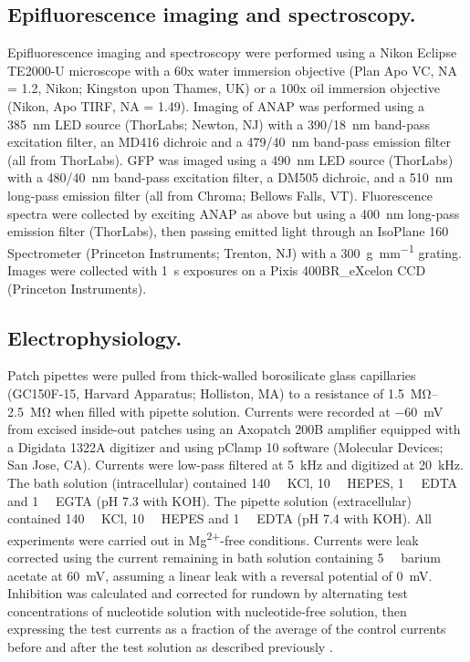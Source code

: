 \documentclass[10pt,lineno, doublespacing]{elife}
\begin{document}
\subsection{Epifluorescence imaging and spectroscopy.}
Epifluorescence imaging and spectroscopy were performed using a Nikon Eclipse TE2000-U microscope with a 60x water immersion objective (Plan Apo VC, NA = 1.2, Nikon; Kingston upon Thames, UK) or a 100x oil immersion objective (Nikon, Apo TIRF, NA = 1.49).
Imaging of ANAP was performed using a \SI{385}{\nano\metre} LED source (ThorLabs; Newton, NJ) with a \SI{390/18}{\nano\metre} band-pass excitation filter, an MD416 dichroic and a \SI{479/40}{\nano\metre} band-pass emission filter (all from ThorLabs).
GFP was imaged using a \SI{490}{\nano\metre} LED source (ThorLabs) with a \SI{480/40}{\nano\metre} band-pass excitation filter, a DM505 dichroic, and a \SI{510}{\nano\metre} long-pass emission filter (all from Chroma; Bellows Falls, VT).
Fluorescence spectra were collected by exciting ANAP as above but using a \SI{400}{\nano\metre} long-pass emission filter (ThorLabs), then passing emitted light through an IsoPlane 160 Spectrometer (Princeton Instruments; Trenton, NJ) with a \SI{300}{\gram\per\milli\metre} grating.
Images were collected with \SI{1}{\second} exposures on a Pixis 400BR\_eXcelon CCD (Princeton Instruments).

\subsection{Electrophysiology.}
Patch pipettes were pulled from thick-walled borosilicate glass capillaries (GC150F-15, Harvard Apparatus; Holliston, MA) to a resistance of \SIrange{1.5}{2.5}{\mega\ohm} when filled with pipette solution.
Currents were recorded at \SI{-60}{\milli\volt} from excised inside-out patches using an Axopatch 200B amplifier equipped with a Digidata 1322A digitizer and using pClamp 10 software (Molecular Devices; San Jose, CA).
Currents were low-pass filtered at \SI{5}{\kilo\hertz} and digitized at \SI{20}{\kilo\hertz}.
The bath solution (intracellular) contained \SI{140}{\milli\Molar} KCl, \SI{10}{\milli\Molar} HEPES, \SI{1}{\milli\Molar} EDTA and \SI{1}{\milli\Molar} EGTA (pH 7.3 with KOH).
The pipette solution (extracellular) contained \SI{140}{\milli\Molar} KCl, \SI{10}{\milli\Molar} HEPES and \SI{1}{\milli\Molar} EDTA (pH 7.4 with KOH).
All experiments were carried out in Mg\textsuperscript{2+}-free conditions.
Currents were leak corrected using the current remaining in bath solution containing \SI{5}{\milli\Molar} barium acetate at \SI{+60}{\milli\volt}, assuming a linear leak with a reversal potential of \SI{0}{\milli\volt}.
Inhibition was calculated and corrected for rundown by alternating test concentrations of nucleotide solution with nucleotide-free solution, then expressing the test currents as a fraction of the average of the control currents before and after the test solution as described previously \citep{RN28}.
\end{document}
